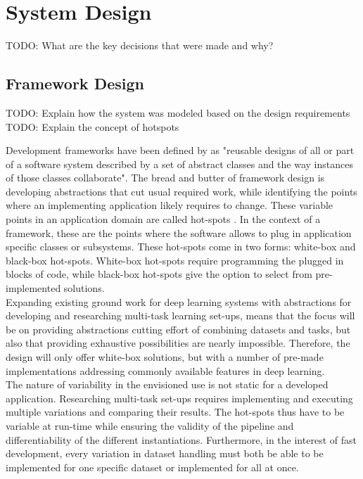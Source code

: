 \chapter{System Design} \label{Design}


TODO: What are the key decisions that were made and why?


\section{Framework Design} \label{Design:Framework}
TODO: Explain how the system was modeled based on the design requirements
TODO: Explain the concept of hotspots

Development frameworks have been defined by \cite{roberts1996evolving} as "reusable designs of all or part of a software system described by a set of abstract classes and the way instances of those classes collaborate". The bread and butter of framework design is developing abstractions that cut usual required work, while identifying the points where an implementing application likely requires to change. These variable points in an application domain are called hot-spots \cite{schmid1997systematic}. In the context of a framework, these are the points where the software allows to plug in application specific classes or subsystems. These hot-spots come in two forms: white-box and black-box hot-spots. White-box hot-spots require programming the plugged in blocks of code, while black-box hot-spots give the option to select from pre-implemented solutions. \\

Expanding existing ground work for deep learning systems with abstractions for developing and researching multi-task learning set-ups, means that the focus will be on providing abstractions cutting effort of combining datasets and tasks, but also that providing exhaustive possibilities are nearly impossible. Therefore, the design will only offer white-box solutions, but with a number of pre-made implementations addressing commonly available features in deep learning.\\

The nature of variability in the envisioned use is not static for a developed application. Researching multi-task set-ups requires implementing and executing multiple variations and comparing their results. The hot-spots thus have to be variable at run-time while ensuring the validity of the pipeline and differentiability of the different instantiations. Furthermore, in the interest of fast development, every variation in dataset handling must both be able to be implemented for one specific dataset or implemented for all at once.\\


